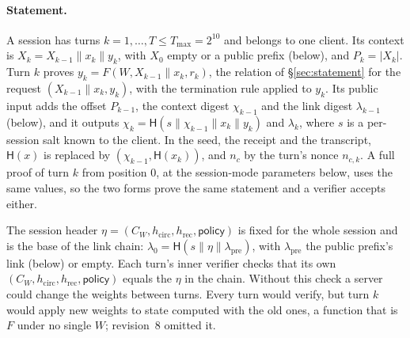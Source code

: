 \documentclass[11pt]{article}
\begin{document}
\paragraph{Statement.}
A session has turns \(k = 1, \ldots, T \le T_{\max} = 2^{10}\) and belongs to one client.
Its context is \(X_k = X_{k-1} \| x_k \| y_k\), with \(X_0\) empty or a public prefix (below), and \(P_k = |X_k|\).
Turn \(k\) proves \(y_k = F(W, X_{k-1} \| x_k, r_k)\), the relation of \S\ref{sec:statement} for the request \((X_{k-1} \| x_k, y_k)\), with the termination rule applied to \(y_k\).
Its public input adds the offset \(P_{k-1}\), the context digest \(\chi_{k-1}\) and the link digest \(\lambda_{k-1}\) (below), and it outputs \(\chi_k = \mathsf{H}(s \| \chi_{k-1} \| x_k \| y_k)\) and \(\lambda_k\), where \(s\) is a per-session salt known to the client.
In the seed, the receipt and the transcript, \(\mathsf{H}(x)\) is replaced by \((\chi_{k-1}, \mathsf{H}(x_k))\), and \(n_c\) by the turn's nonce \(n_{c,k}\).
A full proof of turn \(k\) from position \(0\), at the session-mode parameters below, uses the same values, so the two forms prove the same statement and a verifier accepts either.

The session header \(\eta = (C_W, h_{\mathrm{circ}}, h_{\mathrm{rec}}, \mathsf{policy})\) is fixed for the whole session and is the base of the link chain: \(\lambda_0 = \mathsf{H}(s \| \eta \| \lambda_{\mathrm{pre}})\), with \(\lambda_{\mathrm{pre}}\) the public prefix's link (below) or empty.
Each turn's inner verifier checks that its own \((C_W, h_{\mathrm{circ}}, h_{\mathrm{rec}}, \mathsf{policy})\) equals the \(\eta\) in the chain.
Without this check a server could change the weights between turns. Every turn would verify, but turn \(k\) would apply new weights to state computed with the old ones, a function that is \(F\) under no single \(W\); revision~8 omitted it.
\end{document}
